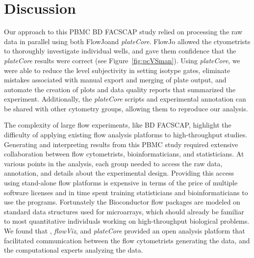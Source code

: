 \documentclass[12pt]{article}
\newcommand{\Rpackage}[1]{{\textit{#1}}}
\begin{document}
\clearpage
\section*{Discussion}


Our approach to this PBMC BD FACS\texttrademark CAP study relied on processing the raw data
in parallel using both FlowJo\texttrademark and \Rpackage{plateCore}. FlowJo\texttrademark
allowed the ctyometrists to thoroughly investigate individual wells, and gave them confidence
that the \Rpackage{plateCore} results were correct (see Figure~\ref{fig:pcVSman}). Using
\Rpackage{plateCore}, we were able to reduce the level subjectivity in setting isotype gates,
eliminate mistakes associated with manual export and merging of plate output,
and automate the creation of plots and data quality reports that summarized the experiment. 
Additionally, the \Rpackage{plateCore} scripts and experimental annotation can
be shared with other cytometry groups, allowing them to reproduce our analysis. 

The complexity of large flow experiments, like BD FACS\texttrademark CAP, highlight the 
difficulty of applying existing flow analysis platforms to high-throughput studies. Generating and
interpreting results from this PBMC study required extensive collaboration between flow cytometrists,
bioinformaticians, and statisticians. At various points in the analysis, each group needed to access
the raw data, annotation, and details about the experimental design. Providing this access using
stand-alone flow platforms is expensive in terms of the price of multiple software licenses
and in time spent training statisticians and bioinformaticians to use the programs. 
Fortunately the Bioconductor flow packages are modeled on standard data structures used for 
microarrays, which should already be familiar to most quantitative individuals working on 
high-throughput biological problems. We found that , \Rpackage{flowViz},
and \Rpackage{plateCore} provided an open analysis platform that facilitated communication between
the flow cytometrists generating the data, and the computational experts analyzing the data.


\clearpage

 
\end{document}
